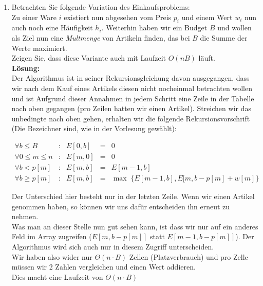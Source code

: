 \documentclass[11pt,a4paper,ngerman]{article}
\begin{document}
\begin{enumerate}[\bfseries (a)]



\item Betrachten Sie folgende Variation des Einkaufsproblems:\\
Zu einer Ware $i$ existiert nun abgesehen vom Preis $p_i$ und einem Wert $w_i$ nun auch noch eine Häufigkeit $h_i$. Weiterhin haben wir ein Budget $B$ und wollen als Ziel nun eine \emph{Multmenge} von Artikeln finden, das bei $B$ die Summe der Werte maximiert.\\
Zeigen Sie, dass diese Variante auch mit Laufzeit $O(nB)$ läuft.\\

\textbf{Lösung:}\\

Der Algorithmus ist in seiner Rekursionsgleichung davon ausgegangen, dass wir nach dem Kauf eines Artikels diesen nicht nocheinmal betrachten wollen und ist Aufgrund dieser Annahmen in jedem Schritt eine Zeile in der Tabelle nach oben gegangen (pro Zeilen hatten wir einen Artikel). Streichen wir das unbedingte nach oben gehen, erhalten wir die folgende Rekursionsvorschrift (Die Bezeichner sind, wie in der Vorlesung gewählt):

$$
\begin{array}{lcrcl}
\forall b \leq B & : & E[0,b] &=& 0\\
\forall 0 \leq m \leq n &:& E[m,0] &=& 0\\
\forall b < p[m] & : & E[m,b] &=& E[m-1,b]\\
\forall b \geq p[m] &:& E[m,b] &=& \max \; \{ E[m-1,b] , E[m, b - p[m] + w[m] \}
\end{array}
$$

Der Unterschied hier besteht nur in der letzten Zeile. Wenn wir einen Artikel genommen haben, so können wir uns dafür entscheiden ihn erneut zu nehmen.\\

Was man an dieser Stelle nun gut sehen kann, ist dass wir nur auf ein anderes Feld im Array zugreifen ($E[m, b- p[m]]$ statt $E[m - 1, b - p[m]]$). Der Algorithmus wird sich auch nur in diesem Zugriff unterscheiden.\\

Wir haben also wider nur $\Theta ( n \cdot B)$ Zellen (Platzverbrauch) und pro Zelle müssen wir 2 Zahlen vergleichen und einen Wert addieren.\\
Dies macht eine Laufzeit von $\Theta ( n \cdot B )$


\end{enumerate}
\end{document}
